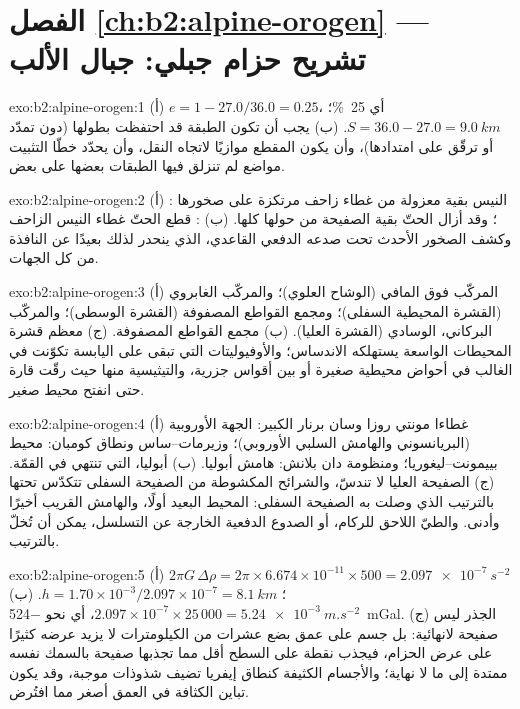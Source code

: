 \section*{الفصل \ref{ch:b2:alpine-orogen} --- تشريح حزام جبلي: جبال الألب}

\begin{solution}{exo:b2:alpine-orogen:1}
(أ) $e = 1 - 27.0/36.0 = 0.25$، أي \qty{25}{\percent}؛ $S = 36.0 - 27.0 =
\qty{9.0}{km}$. (ب) يجب أن تكون الطبقة قد احتفظت بطولها (دون تمدّد أو ترقّق على امتدادها)،
وأن يكون المقطع موازيًا لاتجاه النقل، وأن يحدّد خطّا التثبيت مواضع
لم تنزلق فيها الطبقات بعضها على بعض.
\end{solution}

\begin{solution}{exo:b2:alpine-orogen:2}
(أ) : النيس بقية معزولة من غطاء زاحف مرتكزة على صخورها ؛
وقد أزال الحتّ بقية الصفيحة من حولها كلها. (ب) : قطع الحتّ
غطاء النيس الزاحف وكشف الصخور الأحدث تحت صدعه الدفعي القاعدي، الذي
ينحدر لذلك بعيدًا عن النافذة من كل الجهات.
\end{solution}

\begin{solution}{exo:b2:alpine-orogen:3}
(أ) المركّب فوق المافي (الوشاح العلوي)؛ والمركّب الغابروي (القشرة المحيطية السفلى)؛
ومجمع القواطع المصفوفة (القشرة الوسطى)؛ والمركّب البركاني، الوسادي (القشرة العليا).
(ب) مجمع القواطع المصفوفة. (ج) معظم قشرة المحيطات الواسعة يستهلكه الاندساس؛
والأوفيوليتات التي تبقى على اليابسة تكوّنت في الغالب في أحواض محيطية صغيرة أو بين أقواس
جزرية، والتيثيسية منها حيث رقّت قارة حتى انفتح محيط صغير.
\end{solution}

\begin{solution}{exo:b2:alpine-orogen:4}
(أ) غطاءا مونتي روزا وسان برنار الكبير: الجهة الأوروبية (البريانسوني
والهامش السلبي الأوروبي)؛ وزيرمات--ساس ونطاق كومبان: محيط بييمونت--ليغوريا؛ ومنظومة دان
بلانش: هامش أبوليا. (ب) أبوليا، التي تنتهي في القمّة. (ج) الصفيحة العليا
لا تندسّ، والشرائح المكشوطة من الصفيحة السفلى تتكدّس تحتها بالترتيب الذي
وصلت به الصفيحة السفلى: المحيط البعيد أولًا، والهامش القريب أخيرًا وأدنى. والطيّ اللاحق للركام،
أو الصدوع الدفعية الخارجة عن التسلسل، يمكن أن تُخلّ بالترتيب.
\end{solution}

\begin{solution}{exo:b2:alpine-orogen:5}
(أ) $2\pi G\,\Delta\rho = 2\pi\times6.674\times10^{-11}\times500 =
\qty{2.097e-7}{s^{-2}}$؛ $h = 1.70\times10^{-3}/2.097\times10^{-7} = \qty{8.1}{km}$.
(ب) $2.097\times10^{-7}\times25\,000 = \qty{5.24e-3}{m.s^{-2}}$، أي نحو
\qty{-524}{mGal}. (ج) الجذر ليس صفيحة لانهائية: بل جسم على عمق بضع عشرات من الكيلومترات
لا يزيد عرضه كثيرًا على عرض الحزام، فيجذب نقطة على السطح أقل مما تجذبها
صفيحة بالسمك نفسه ممتدة إلى ما لا نهاية؛ والأجسام الكثيفة كنطاق إيفريا
تضيف شذوذات موجبة، وقد يكون تباين الكثافة في العمق أصغر مما افتُرض.
\end{solution}

